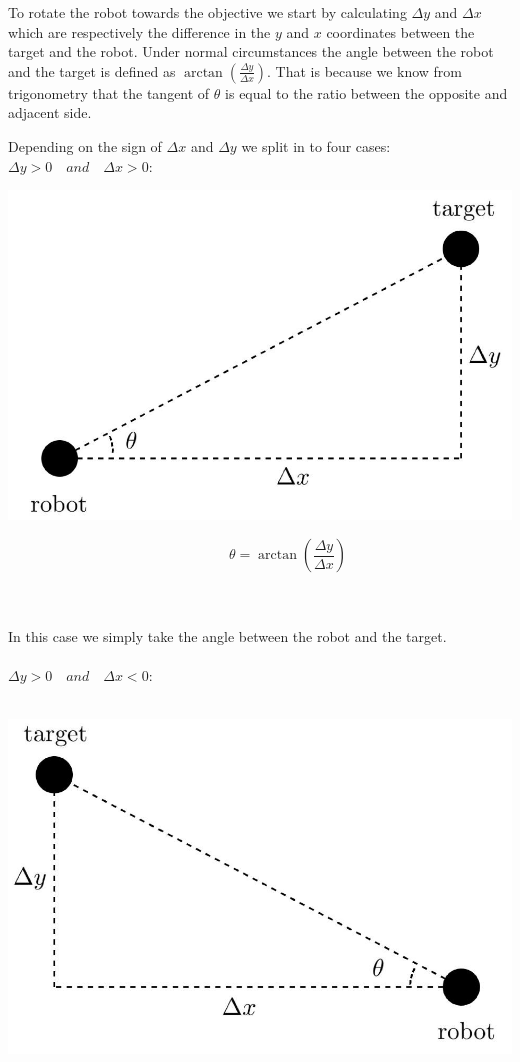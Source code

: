 To rotate the robot towards the objective we start by calculating $\Delta y$ and $\Delta x$ which are respectively the difference in the $y$ and $x$ coordinates between the target and the robot. Under normal circumstances the angle between the robot and the target is defined as $\arctan (\frac{\Delta y}{\Delta x})$. That is because we know from trigonometry that the tangent of $\theta$ is equal to the ratio between the opposite and adjacent side.
\cite{analisi1}
\par
Depending on the sign of $\Delta x$ and $\Delta y$ we split in to four cases:
\newpage
\textbf{$\Delta y > 0 \quad and \quad \Delta x > 0$}: \\ 
\begin{minipage}{0.4\textwidth}
\includegraphics[width=\linewidth]{images/theta1.jpg}
\end{minipage}
\begin{minipage}{0.5\textwidth}\raggedleft
$$\quad \quad \quad \quad \theta = \arctan\left(\frac{\Delta y}{\Delta x}\right)$$ \\
\end{minipage}
\noindent
\\
In this case we simply take the angle between the robot and the target.
\\
\\
\textbf{$\Delta y > 0 \quad and \quad \Delta x < 0$}: \\ \\
\begin{minipage}{0.4\textwidth}
\includegraphics[width=\linewidth]{images/theta2.jpg}
\end{minipage}
